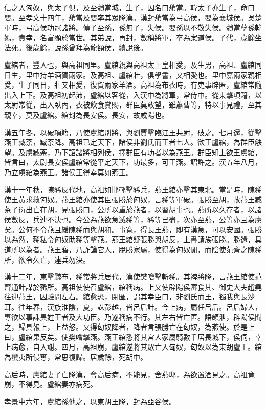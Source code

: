 信之入匈奴，與太子俱，及至穨當城，生子，因名曰穨當。韓太子亦生子，命曰嬰。至孝文十四年，穨當及嬰率其眾降漢。漢封穨當為弓高侯，嬰為襄城侯。吳楚軍時，弓高侯功冠諸將。傳子至孫，孫無子，失侯。嬰孫以不敬失侯。穨當孽孫韓嫣，貴幸，名富顯於當世。其弟說，再封，數稱將軍，卒為案道侯。子代，歲餘坐法死。後歲餘，說孫曾拜為龍頟侯，續說後。

盧綰者，豐人也，與高祖同里。盧綰親與高祖太上皇相愛，及生男，高祖、盧綰同日生，里中持羊酒賀兩家。及高祖、盧綰壯，俱學書，又相愛也。里中嘉兩家親相愛，生子同日，壯又相愛，復賀兩家羊酒。高祖為布衣時，有吏事辟匿，盧綰常隨出入上下。及高祖初起沛，盧綰以客從，入漢中為將軍，常侍中。從東擊項籍，以太尉常從，出入臥內，衣被飲食賞賜，群臣莫敢望，雖蕭曹等，特以事見禮，至其親幸，莫及盧綰。綰封為長安侯。長安，故咸陽也。

漢五年冬，以破項籍，乃使盧綰別將，與劉賈擊臨江王共尉，破之。七月還，從擊燕王臧荼，臧荼降。高祖已定天下，諸侯非劉氏而王者七人。欲王盧綰，為群臣觖望。及虜臧荼，乃下詔諸將相列侯，擇群臣有功者以為燕王。群臣知上欲王盧綰，皆言曰，太尉長安侯盧綰常從平定天下，功最多，可王燕。詔許之。漢五年八月，乃立虜綰為燕王。諸侯王得幸莫如燕王。

漢十一年秋，陳豨反代地，高祖如邯鄲擊豨兵，燕王綰亦擊其東北。當是時，陳豨使王黃求救匈奴。燕王綰亦使其臣張勝於匈奴，言豨等軍破。張勝至胡，故燕王臧茶子衍出亡在胡，見張勝曰，公所以重於燕者，以習胡事也。燕所以久存者，以諸侯數反，兵連不決也。今公為燕欲急滅豨等，豨等已盡，次亦至燕，公等亦且為虜矣。公何不令燕且緩陳豨而與胡和。事寬，得長王燕，即有漢急，可以安國。張勝以為然，豨私令匈奴助豨等擊燕。燕王綰疑張勝與胡反，上書請族張勝。勝還，具道所以為者。燕王寤，乃詐論它人，脫勝家屬，使得為匈奴閒，而陰使范齊之陳豨所，欲令久亡，連兵勿決。

漢十二年，東擊黥布，豨常將兵居代，漢使樊噲擊斬豨。其裨將降，言燕王綰使范齊通計謀於豨所。高祖使使召盧綰，綰稱病。上又使辟陽侯審食其、御史大夫趙堯往迎燕王，因驗問左右。綰愈恐，閉匿，謂其幸臣曰，非劉氏而王，獨我與長沙耳。往年春，漢族淮陰，夏，誅彭越，皆呂后計。今上病，屬任呂后。呂后婦人，專欲以事誅異姓王者及大功臣。乃遂稱病不行。其左右皆亡匿。語頗泄，辟陽侯聞之，歸具報上，上益怒。又得匈奴降者，降者言張勝亡在匈奴，為燕使。於是上曰，盧綰果反矣。使樊噲擊燕。燕王綰悉將其宮人家屬騎數千居長城下，侯伺，幸上病愈，自入謝。四月，高祖崩，盧綰遂將其眾亡入匈奴，匈奴以為東胡盧王。綰為蠻夷所侵奪，常思復歸。居歲餘，死胡中。

高后時，盧綰妻子亡降漢，會高后病，不能見，舍燕邸，為欲置酒見之。高祖竟崩，不得見。盧綰妻亦病死。

孝景中六年，盧綰孫他之，以東胡王降，封為亞谷侯。

